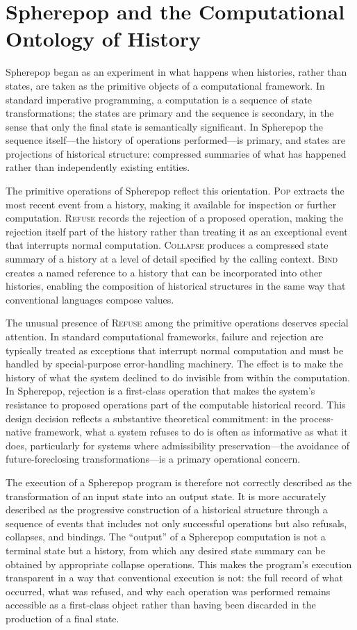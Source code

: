 \documentclass[11pt, oneside]{book}
\theoremstyle{definition}
\theoremstyle{remark}
\begin{document}
\section{Spherepop and the Computational Ontology of History}

Spherepop began as an experiment in what happens when histories, rather than states, are taken as the primitive objects of a computational framework. In standard imperative programming, a computation is a sequence of state transformations; the states are primary and the sequence is secondary, in the sense that only the final state is semantically significant. In Spherepop the sequence itself—the history of operations performed—is primary, and states are projections of historical structure: compressed summaries of what has happened rather than independently existing entities.

The primitive operations of Spherepop reflect this orientation. \textsc{Pop} extracts the most recent event from a history, making it available for inspection or further computation. \textsc{Refuse} records the rejection of a proposed operation, making the rejection itself part of the history rather than treating it as an exceptional event that interrupts normal computation. \textsc{Collapse} produces a compressed state summary of a history at a level of detail specified by the calling context. \textsc{Bind} creates a named reference to a history that can be incorporated into other histories, enabling the composition of historical structures in the same way that conventional languages compose values.

The unusual presence of \textsc{Refuse} among the primitive operations deserves special attention. In standard computational frameworks, failure and rejection are typically treated as exceptions that interrupt normal computation and must be handled by special-purpose error-handling machinery. The effect is to make the history of what the system declined to do invisible from within the computation. In Spherepop, rejection is a first-class operation that makes the system's resistance to proposed operations part of the computable historical record. This design decision reflects a substantive theoretical commitment: in the process-native framework, what a system refuses to do is often as informative as what it does, particularly for systems where admissibility preservation—the avoidance of future-foreclosing transformations—is a primary operational concern.

The execution of a Spherepop program is therefore not correctly described as the transformation of an input state into an output state. It is more accurately described as the progressive construction of a historical structure through a sequence of events that includes not only successful operations but also refusals, collapses, and bindings. The ``output'' of a Spherepop computation is not a terminal state but a history, from which any desired state summary can be obtained by appropriate collapse operations. This makes the program's execution transparent in a way that conventional execution is not: the full record of what occurred, what was refused, and why each operation was performed remains accessible as a first-class object rather than having been discarded in the production of a final state.
\end{document}
